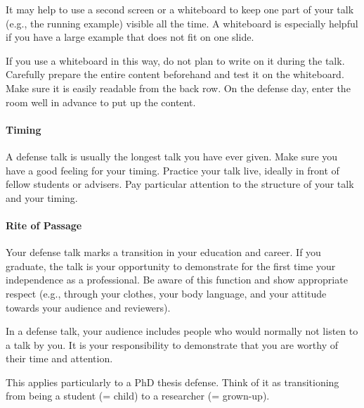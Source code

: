\documentclass[12pt]{article}
\begin{document}
It may help to use a second screen or a whiteboard to keep one part of your talk (e.g., the running example) visible all the time.
A whiteboard is especially helpful if you have a large example that does not fit on one slide.

If you use a whiteboard in this way, do not plan to write on it during the talk.
Carefully prepare the entire content beforehand and test it on the whiteboard. Make sure it is easily readable from the back row.
On the defense day, enter the room well in advance to put up the content.

\paragraph{Timing}
A defense talk is usually the longest talk you have ever given.
Make sure you have a good feeling for your timing.
Practice your talk live, ideally in front of fellow students or advisers.
Pay particular attention to the structure of your talk and your timing.

\paragraph{Rite of Passage}
Your defense talk marks a transition in your education and career.
If you graduate, the talk is your opportunity to demonstrate for the first time your independence as a professional.
Be aware of this function and show appropriate respect (e.g., through your clothes, your body language, and your attitude towards your audience and reviewers).
\medskip

In a defense talk, your audience includes people who would normally not listen to a talk by you.
It is your responsibility to demonstrate that you are worthy of their time and attention.
\medskip

This applies particularly to a PhD thesis defense.
Think of it as transitioning from being a student (= child) to a researcher (= grown-up).
\end{document}
